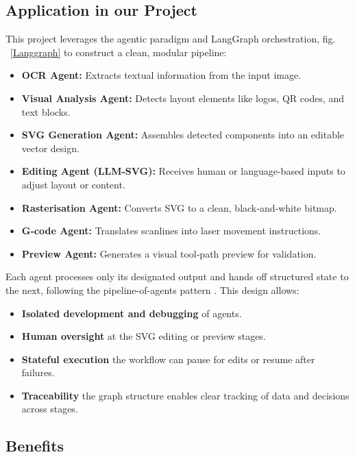 \subsection{Application in our Project}
This project leverages the agentic paradigm and LangGraph orchestration, fig. ~\ref{Langgraph} to construct a clean, modular pipeline:

\begin{itemize}
	\item \textbf{OCR Agent:} Extracts textual information from the input image.
	\item \textbf{Visual Analysis Agent:} Detects layout elements like logos, QR codes, and text blocks.
	\item \textbf{SVG Generation Agent:} Assembles detected components into an editable vector design.
	\item \textbf{Editing Agent (LLM-SVG):} Receives human or language-based inputs to adjust layout or content.
	\item \textbf{Rasterisation Agent:} Converts SVG to a clean, black‑and‑white bitmap.
	\item \textbf{G‑code Agent:} Translates scanlines into laser movement instructions.
	\item \textbf{Preview Agent:} Generates a visual tool‑path preview for validation.
\end{itemize}

Each agent processes only its designated output and hands off structured state to the next, following the pipeline-of-agents pattern \cite{Honchar:PipelineOfAgents2025}. This design allows:
\begin{itemize}
\item \textbf{Isolated development and debugging} of agents.
\item \textbf{Human oversight} at the SVG editing or preview stages.
\item \textbf{Stateful execution} the workflow can pause for edits or resume after failures.
\item \textbf{Traceability} the graph structure enables clear tracking of data and decisions across stages.
\end{itemize}

\subsection{Benefits}

